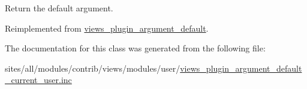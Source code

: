Return the default argument. 

Reimplemented from \hyperlink{classviews__plugin__argument__default_8e67864f4a1ce20b12bc82afe1acd255}{views\_\-plugin\_\-argument\_\-default}.

The documentation for this class was generated from the following file:\begin{CompactItemize}
\item 
sites/all/modules/contrib/views/modules/user/\hyperlink{views__plugin__argument__default__current__user_8inc}{views\_\-plugin\_\-argument\_\-default\_\-current\_\-user.inc}\end{CompactItemize}
